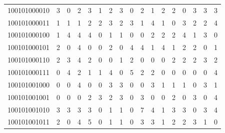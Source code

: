 \documentclass[10pt,a4paper]{article}
\begin{document}
\begin{longtable}{ |c|c|c|c|c|c|c|c|c|c|c|c|c|c|c|c|c| }
    100101000010              & 3                            & 0                                & 2                            & 3                              & 1   & 2   & 3   & 0   & 2   & 1   & 2   & 2   & 0   & 3   & 3   & 3   \\
    100101000011              & 1                            & 1                                & 1                            & 2                              & 2   & 3   & 2   & 3   & 1   & 4   & 1   & 0   & 3   & 2   & 2   & 4   \\
    100101000100              & 1                            & 4                                & 4                            & 4                              & 0   & 1   & 1   & 0   & 0   & 2   & 2   & 2   & 4   & 1   & 3   & 0   \\
    100101000101              & 2                            & 0                                & 4                            & 0                              & 0   & 2   & 0   & 4   & 4   & 1   & 4   & 1   & 2   & 2   & 0   & 1   \\
    100101000110              & 2                            & 3                                & 4                            & 2                              & 0   & 0   & 1   & 2   & 0   & 0   & 0   & 2   & 2   & 2   & 3   & 2   \\
    100101000111              & 0                            & 4                                & 2                            & 1                              & 1   & 4   & 0   & 5   & 2   & 2   & 0   & 0   & 0   & 0   & 0   & 4   \\
    100101001000              & 0                            & 0                                & 4                            & 0                              & 0   & 3   & 3   & 0   & 0   & 3   & 1   & 1   & 1   & 0   & 3   & 1   \\
    100101001001              & 0                            & 0                                & 0                            & 2                              & 3   & 2   & 3   & 0   & 3   & 0   & 0   & 2   & 0   & 3   & 0   & 4   \\
    100101001010              & 3                            & 3                                & 3                            & 3                              & 0   & 1   & 1   & 0   & 7   & 4   & 1   & 3   & 3   & 0   & 3   & 4   \\
    100101001011              & 2                            & 0                                & 4                            & 5                              & 0   & 1   & 1   & 0   & 3   & 3   & 1   & 2   & 2   & 3   & 1   & 0   \\

\end{longtable}
\end{document}
